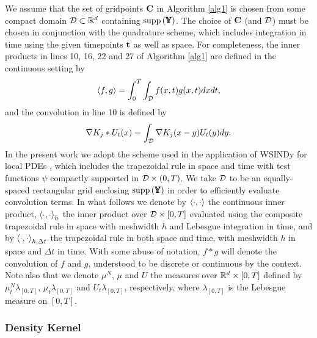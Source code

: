 \documentclass[english,reqno]{amsart}
\begin{document}
We assume that the set of gridpoints $\mathbf{C}$ in Algorithm \ref{alg1} is chosen from some compact domain ${\mathcal{D}}\subset \mathbb{R}^d$ containing $\text{supp}\left(\pmb{\mathbb{Y}}\right)$. The choice of $\mathbf{C}$ (and ${\mathcal{D}}$) must be chosen in conjunction with the quadrature scheme, which includes integration in time using the given timepoints $\mathbf{t}$ as well as space. For completeness, the inner products in lines 10, 16, 22 and 27 of Algorithm \ref{alg1} are defined in the continuous setting by 
\[\left\langle f,g\right\rangle = \int_0^T\int_{{\mathcal{D}}} f(x,t)g(x,t)dxdt,\]
and the convolution in line 10 is defined by
\[\nabla K_j * U_t(x) = \int_{{\mathcal{D}}} \nabla K_j(x-y) U_t(y)dy.\]
In the present work we adopt the scheme used in the application of WSINDy for local PDEs \cite{messenger2020weakpde}, which includes the trapezoidal rule in space and time with test functions $\psi$ compactly supported in ${\mathcal{D}}\times (0,T)$. We take ${\mathcal{D}}$ to be an equally-spaced rectangular grid enclosing $\text{supp}\left(\pmb{\mathbb{Y}}\right)$ in order to efficiently evaluate convolution terms. In what follows we denote by $\left\langle\cdot, \cdot\right\rangle$ the continuous inner product, $\left\langle \cdot,\cdot\right\rangle_h$ the inner product over ${\mathcal{D}}\times[0,T]$ evaluated using the composite trapezoidal rule in space with meshwidth $h$ and Lebesgue integration in time, and by $\left\langle \cdot,\cdot\right\rangle_{h,\Delta t}$ the trapezoidal rule in both space and time, with meshwidth $h$ in space and $\Delta t$ in time. With some abuse of notation, $f*g$ will denote the convolution of $f$ and $g$, understood to be discrete or continuous by the context. Note also that we denote $\mu^N$, $\mu$ and $U$ the measures over $\mathbb{R}^d\times [0,T]$ defined by $\mu^N_t\lambda_{[0,T]}$, $\mu_t\lambda_{[0,T]}$ and $U_t\lambda_{[0,T]}$, respectively, where $ \lambda_{[0,T]} $ is the Lebesgue measure on $[0,T]$.


\subsubsection{Density Kernel}\label{sec:hist}
\end{document}
